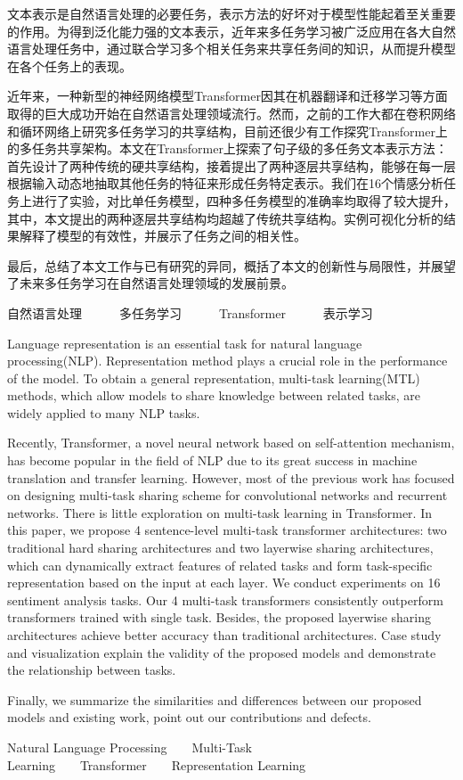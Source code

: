 \begin{cabstract}
	文本表示是自然语言处理的必要任务，表示方法的好坏对于模型性能起着至关重要的作用。为得到泛化能力强的文本表示，近年来多任务学习被广泛应用在各大自然语言处理任务中，通过联合学习多个相关任务来共享任务间的知识，从而提升模型在各个任务上的表现。
	
	近年来，一种新型的神经网络模型Transformer因其在机器翻译和迁移学习等方面取得的巨大成功开始在自然语言处理领域流行。然而，之前的工作大都在卷积网络和循环网络上研究多任务学习的共享结构，目前还很少有工作探究Transformer上的多任务共享架构。本文在Transformer上探索了句子级的多任务文本表示方法：首先设计了两种传统的硬共享结构，接着提出了两种逐层共享结构，能够在每一层根据输入动态地抽取其他任务的特征来形成任务特定表示。我们在16个情感分析任务上进行了实验，对比单任务模型，四种多任务模型的准确率均取得了较大提升，其中，本文提出的两种逐层共享结构均超越了传统共享结构。实例可视化分析的结果解释了模型的有效性，并展示了任务之间的相关性。
	
	最后，总结了本文工作与已有研究的异同，概括了本文的创新性与局限性，并展望了未来多任务学习在自然语言处理领域的发展前景。
\end{cabstract}


\begin{ckeywords}
	自然语言处理\ \ \ \ \ \ 多任务学习\ \ \ \ \ \ Transformer\ \ \ \ \ \ 表示学习
\end{ckeywords}



\begin{eabstract}
	Language representation is an essential task for natural language processing(NLP). Representation method plays a crucial role in the performance of the model. To obtain a general representation, multi-task learning(MTL) methods, which allow models to share knowledge between related tasks, are widely applied to many NLP tasks.
	
	Recently, Transformer, a novel neural network based on self-attention mechanism, has become popular in the field of NLP due to its great success in machine translation and transfer learning. However, most of the previous work has focused on designing multi-task sharing scheme for convolutional networks and recurrent networks. There is little exploration on multi-task learning in Transformer. In this paper, we propose 4 sentence-level multi-task transformer architectures: two traditional hard sharing architectures and two layerwise sharing architectures, which can dynamically extract features of related tasks and form task-specific representation based on the input at each layer. We conduct experiments on 16 sentiment analysis tasks. Our 4 multi-task transformers consistently outperform transformers trained with single task. Besides, the proposed layerwise sharing architectures achieve better accuracy than traditional architectures. Case study and visualization explain the validity of the proposed models and demonstrate the relationship between tasks.
	
	Finally, we summarize the similarities and differences between our proposed models and existing work, point out our contributions and defects.
	
\end{eabstract}


\begin{ekeywords}
	Natural Language Processing\ \ \ \ Multi-Task Learning\ \ \ \ Transformer\ \ \ \ Representation Learning
\end{ekeywords}

